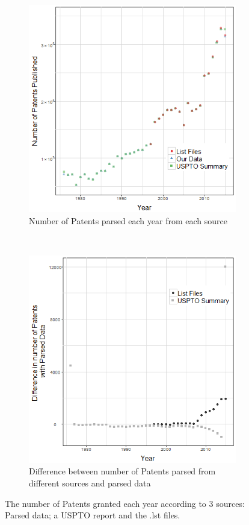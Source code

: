 \begin{figure}
\centering
\begin{subfigure}{\textwidth}
  \centering
  \includegraphics[width=0.9\linewidth]{Figures/patentsCompared}
 \caption{Number of Patents parsed each year from each source}
\label{fig:patentsCompared}
\end{subfigure}%
\\
\begin{subfigure}{\textwidth}
  \centering
  \includegraphics[width=0.7\linewidth]{Figures/patentsDiff}
  \caption{\footnotesize Difference between number of Patents parsed from different sources and parsed data}
\label{fig:patentsDiff}
\end{subfigure}
\caption[Difference between number of patents parsed from different sources]{\footnotesize The number of Patents granted each year according to 3 sources: Parsed data; a USPTO report and the .lst files.}
\label{fig:patentCountsTest}
\end{figure}

